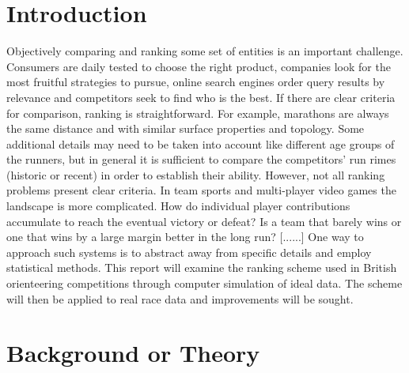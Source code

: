 %

\section{Introduction}

Objectively comparing and ranking some set of entities is an important challenge. Consumers are daily tested to choose the right product, companies look for the most fruitful strategies to pursue, online search engines order query results by relevance and competitors seek to find who is the best. If there are clear criteria for comparison, ranking is straightforward. For example, marathons are always the same distance and with similar surface properties and topology. Some additional details may need to be taken into account like different age groups of the runners, but in general it is sufficient to compare the competitors' run rimes (historic or recent) in order to establish their ability. 
However, not all ranking problems present clear criteria. In team sports and multi-player video games the landscape is more complicated. How do individual player contributions accumulate to reach the eventual victory or defeat? Is a team that barely wins or one that wins by a large margin better in the long run? [......]
One way to approach such systems is to abstract away from specific details and employ statistical methods. This report will examine the ranking scheme used in British orienteering competitions through computer simulation of ideal data. The scheme will then be applied to real race data and improvements will be sought.






\section{Background or Theory}

